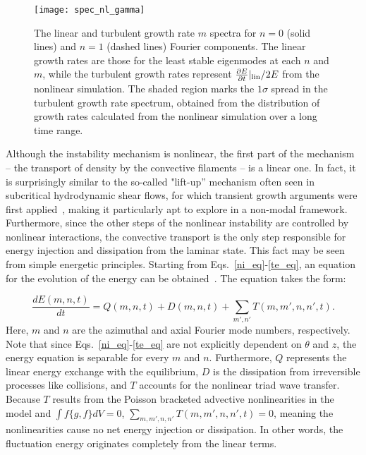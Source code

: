 \documentclass[showpacs,preprintnumbers,amsmath,amssymb,superscriptaddress,aip]{revtex4-1}
\def\beq{\begin{equation}}
\def\eeq{\end{equation}}
\newcommand{\diff}[2]{\frac{d#1}{d#2}}
\newcommand{\pdiff}[2]{\frac{\partial#1}{\partial#2}}
\begin{document}
\begin{figure}
\centerline{\texttt{[image: spec\_nl\_gamma]}}
\caption{The linear and turbulent growth rate $m$ spectra for $n=0$ (solid lines) and $n=1$ (dashed lines) Fourier components. The linear growth rates are those for the least stable eigenmodes at each
$n$ and $m$, while the turbulent growth rates represent $\pdiff{E}{t}|_{\rm{lin}}/2 E$ from the nonlinear simulation. The shaded region marks the $1 \sigma$ spread in the turbulent growth rate spectrum,
obtained from the distribution of growth rates calculated from the nonlinear simulation over a long time range.}
\label{spec_nl_gamma}
\end{figure}

Although the instability mechanism is nonlinear, the first part of the mechanism -- the transport of density by the convective filaments -- is a linear one. 
In fact, it is surprisingly similar to the so-called "lift-up'' mechanism often seen in subcritical hydrodynamic shear flows, for which transient growth arguments were first applied~\cite{trefethen1993},
making it particularly apt to explore in a non-modal framework. Furthermore, since the other steps of the nonlinear instability
are controlled by nonlinear interactions, the convective transport is the only step responsible for energy injection and dissipation from the laminar state. This fact may be seen from simple
energetic principles. Starting from Eqs.~\ref{ni_eq}-\ref{te_eq},
an equation for the evolution of the energy can be obtained~\cite{friedman2012,friedman2012b}. The equation takes the form:

\beq
\label{dEdt_def}
\diff{E(m,n,t)}{t} = Q(m,n,t) + D(m,n,t) + \sum_{m',n'} T(m,m',n,n',t).
\eeq
Here, $m$ and $n$ are the azimuthal and axial Fourier mode numbers, respectively. Note that since Eqs.~\ref{ni_eq}-\ref{te_eq} are not explicitly dependent on $\theta$ and $z$, the energy equation
is separable for every $m$ and $n$. Furthermore, $Q$ represents the linear energy exchange with the equilibrium, $D$ is the dissipation from irreversible processes
like collisions, and $T$ accounts for the nonlinear triad wave transfer. Because $T$ results from the Poisson bracketed advective nonlinearities in the model and $\int f \{g,f\} dV = 0$, 
$\sum_{m,m',n,n'} T(m,m',n,n',t)=0$, meaning the nonlinearities cause no net energy injection or dissipation. In other words, the fluctuation energy originates completely from the linear terms.
\end{document}
